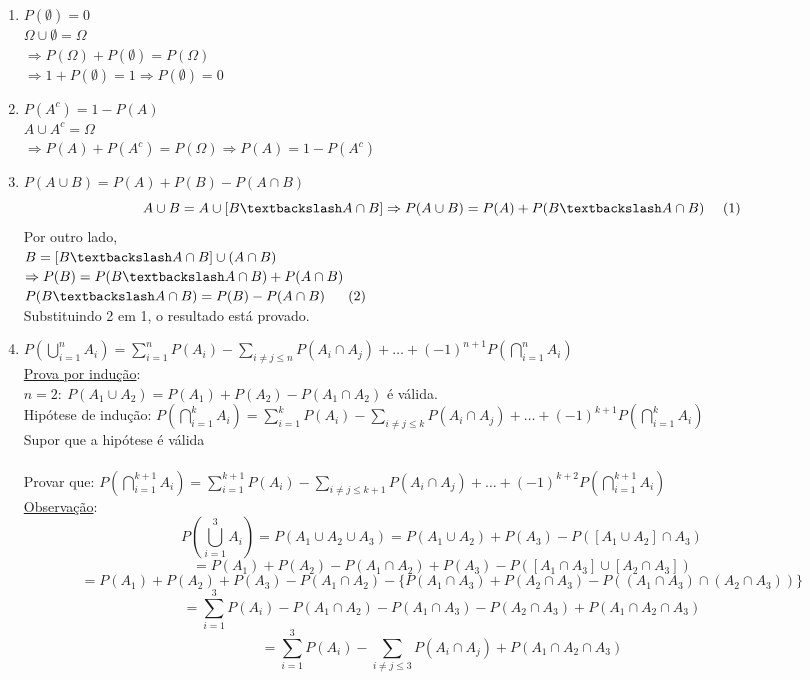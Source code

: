 \documentclass[a4paper,12pt]{article}
\begin{document}
\begin{enumerate}[label=\textbf{\arabic*)}]
	\item $P(\emptyset)=0 $\\
 $\Omega\cup\emptyset=\Omega $\\
 $\Rightarrow P(\Omega) +P(\emptyset)=P(\Omega)$\\
 $\Rightarrow 1 +P(\emptyset)=1 \Rightarrow P(\emptyset)=0$
 \item $P(A^c)=1-P(A)$\\
 $A\cup A^c=\Omega $\\
 $\Rightarrow P(A)+P(A^c)=P(\Omega)\Rightarrow P(A)=1-P(A^c) $
 \item $P(A\cup B)=P(A)+P(B)-P(A\cap B)$\\
 $$A\cup B=A\cup[B\textbackslash A\cap B] \Rightarrow P(A\cup B)=P(A)+P(B\textbackslash A\cap B) \ \ \ \ (1)$$
 Por outro lado,\\
 $B=[B\textbackslash A\cap B]\cup(A\cap B)$\\
 $\Rightarrow P(B) = P(B\textbackslash A\cap B) +P(A\cap B)$\\
 $P(B\textbackslash A\cap B)=P(B) - P(A\cap B) \ \ \ \ \ (2) $\\
 Substituindo 2 em 1,  o resultado está provado.
 \item $P(\bigcup\limits_{i=1}^{n}A_i)=\sum\limits_{i=1}^n P(A_i)- \sum\limits_{i\ne j \le n}P(A_i\cap A_j)+\ldots+(-1)^{n+1}P(\bigcap\limits_{i=1}^nA_i) $\\
 \underline{Prova por indução}:\\
 
 $n=2: \ P(A_1\cup A_2)=P(A_1)+P(A_2)-P(A_1\cap A_2) $ é válida.\\
 Hipótese de indução: $P(\bigcap\limits_{i=1}^k A_i)=\sum\limits_{i=1}^{k}P(A_i)- \sum\limits_{i\ne j \le k}P(A_i\cap A_j)+\ldots+(-1)^{k+1}P(\bigcap\limits_{i=1}^kA_i)  $\\
 Supor que a hipótese é válida\\
 \\
 Provar que: $P(\bigcap\limits_{i=1}^{k+1}A_i)=\sum\limits_{i=1}^{k+1}P(A_i)- \sum\limits_{i\ne j \le k+1}P(A_i\cap A_j)+\ldots+(-1)^{k+2}P(\bigcap\limits_{i=1}^{k+1}A_i)  $\\
 \underline{Observação}:
 $$P(\bigcup\limits_{i=1}^3 A_i)=P(A_1\cup A_2 \cup A_3)=P(A_1\cup A_2)+P(A_3)-P([A_1\cup A_2]\cap A_3) $$
 $$=P(A_1)+P(A_2)-P(A_1\cap A_2)+P(A_3)- P([A_1\cap A_3]\cup [A_2\cap A_3]) $$
 $$=P(A_1)+P(A_2)+P(A_3 )- P(A_1\cap A_2)- \bigg\{ P(A_1\cap A_3)+P(A_2\cap A_3) - P((A_1\cap A_3)\cap (A_2 \cap A_3))  \bigg\} $$
 $$=\sum\limits_{i=1}^3 P(A_i)-P(A_1\cap A_2) - P(A_1\cap A_3) - P(A_2\cap A_3) + P(A_1\cap A_2\cap A_3) $$
  $$=\sum\limits_{i=1}^3 P(A_i)-\sum\limits_{i\ne j \le 3}P(A_i\cap A_j) +P(A_1\cap A_2\cap A_3) $$
\end{enumerate}
\end{document}
